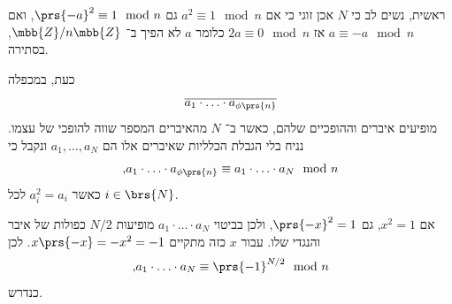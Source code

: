 \documentclass[a4paper,10pt,twoside,openany]{book}
\begin{document}
\begin{solution}
ראשית, נשים לב כי
$N$
אכן זוגי כי אם
$a^2 \equiv 1 \mod{n}$
גם
$\prs{-a}^2 \equiv 1 \mod{n}$,
ואם
$a \equiv -a \mod{n}$
אז
$2a \equiv 0 \mod{n}$
כלומר
$a$
לא הפיך ב־%
$\mbb{Z} / n\mbb{Z}$,
בסתירה.

כעת, במכפלה
\[\overline{a_1 \cdot \ldots \cdot a_{\phi\prs{n}}}\]
מופיעים איברים וההופכיים שלהם, כאשר ב־%
$N$
מהאיברים המספר שווה להופכי של עצמו.
נניח בלי הגבלת הכלליות שאיברים אלו הם
$a_1, \ldots, a_N$
ונקבל כי
\[\text{,} a_1 \cdot \ldots \cdot a_{\phi\prs{n}} \equiv a_1 \cdot \ldots \cdot a_N \mod{n}\]
כאשר
$a_i^2 = a_i$
לכל
$i \in \brs{N}$.

אם
$x^2 = 1$,
גם
$\prs{-x}^2 = 1$,
ולכן בביטוי
$a_1 \cdot \ldots \cdot a_N$
מופיעות
$N/2$
כפולות של איבר והנגדי שלו.
עבור
$x$
כזה מתקיים
$x \prs{-x} = -x^2 = -1$.
לכן
\[\text{,} a_1 \cdot \ldots \cdot a_N \equiv \prs{-1}^{N/2} \mod{n}\]
כנדרש.
\end{solution}

\printbibliography
\end{document}
